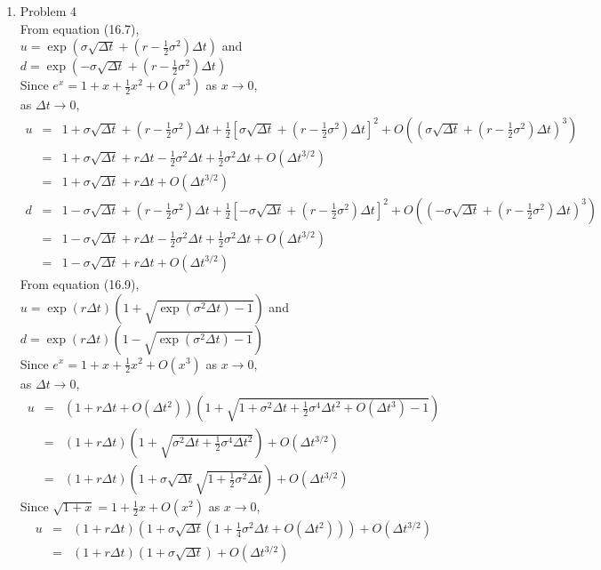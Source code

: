 \documentclass[a4paper]{article}
\def\dd{\Delta}
\def\lb{\left(}
\def\rb{\right)}
\def\lB{\left[}
\def\rB{\right]}
\begin{document}
\begin{enumerate}
\item Problem 4\\
From equation (16.7),\\
$u=\exp\lb\sigma\sqrt{\dd t}+\lb r-\frac{1}{2}\sigma^2\rb\dd t\rb$ and $d=\exp\lb-\sigma\sqrt{\dd t}+\lb r-\frac{1}{2}\sigma^2\rb\dd t\rb$\\
Since $e^x=1+x+\frac{1}{2}x^2+O(x^3)$ as $x\rightarrow 0$,\\
as $\dd t\rightarrow 0$,
\begin{eqnarray*}
u&=&1+\sigma\sqrt{\dd t}+\lb r-\frac{1}{2}\sigma^2\rb\dd t+\frac{1}{2}\lB\sigma\sqrt{\dd t}+\lb r-\frac{1}{2}\sigma^2\rb\dd t\rB^2+O\lb\lb\sigma\sqrt{\dd t}+\lb r-\frac{1}{2}\sigma^2\rb\dd t\rb^3\rb\\
&=&1+\sigma\sqrt{\dd t}+r\dd t-\frac{1}{2}\sigma^2\dd t+\frac{1}{2}\sigma^2\dd t+O(\dd t^{3/2})\\
&=&1+\sigma\sqrt{\dd t}+r\dd t+O(\dd t^{3/2})\\
d&=&1-\sigma\sqrt{\dd t}+\lb r-\frac{1}{2}\sigma^2\rb\dd t+\frac{1}{2}\lB-\sigma\sqrt{\dd t}+\lb r-\frac{1}{2}\sigma^2\rb\dd t\rB^2+O\lb\lb-\sigma\sqrt{\dd t}+\lb r-\frac{1}{2}\sigma^2\rb\dd t\rb^3\rb\\
&=&1-\sigma\sqrt{\dd t}+r\dd t-\frac{1}{2}\sigma^2\dd t+\frac{1}{2}\sigma^2\dd t+O(\dd t^{3/2})\\
&=&1-\sigma\sqrt{\dd t}+r\dd t+O(\dd t^{3/2})
\end{eqnarray*}
From equation (16.9),\\
$u=\exp(r\dd t)(1+\sqrt{\exp(\sigma^2\dd t)-1})$ and $d=\exp(r\dd t)(1-\sqrt{\exp(\sigma^2\dd t)-1})$\\
Since $e^x=1+x+\frac{1}{2}x^2+O(x^3)$ as $x\rightarrow 0$,\\
as $\dd t\rightarrow 0$,
\begin{eqnarray*}
u&=&\lb 1+r\dd t+O(\dd t^2)\rb\lb 1+\sqrt{1+\sigma^2\dd t+\frac{1}{2}\sigma^4\dd t^2+O(\dd t^3)-1}\rb\\
&=&\lb 1+r\dd t\rb\lb 1+\sqrt{\sigma^2\dd t+\frac{1}{2}\sigma^4\dd t^2}\rb+O(\dd t^{3/2})\\
&=&\lb 1+r\dd t\rb\lb 1+\sigma\sqrt{\dd t}\sqrt{1+\frac{1}{2}\sigma^2\dd t}\rb+O(\dd t^{3/2})
\end{eqnarray*}
Since $\sqrt{1+x}=1+\frac{1}{2}x+O(x^2)$ as $x\rightarrow 0$,
\begin{eqnarray*}
u&=&(1+r\dd t)\lb 1+\sigma\sqrt{\dd t}\lb 1+\frac{1}{4}\sigma^2\dd t+O(\dd t^2)\rb\rb+O(\dd t^{3/2})\\
&=&(1+r\dd t)(1+\sigma\sqrt{\dd t})+O(\dd t^{3/2})\\

\end{eqnarray*}
\end{enumerate}
\end{document}
